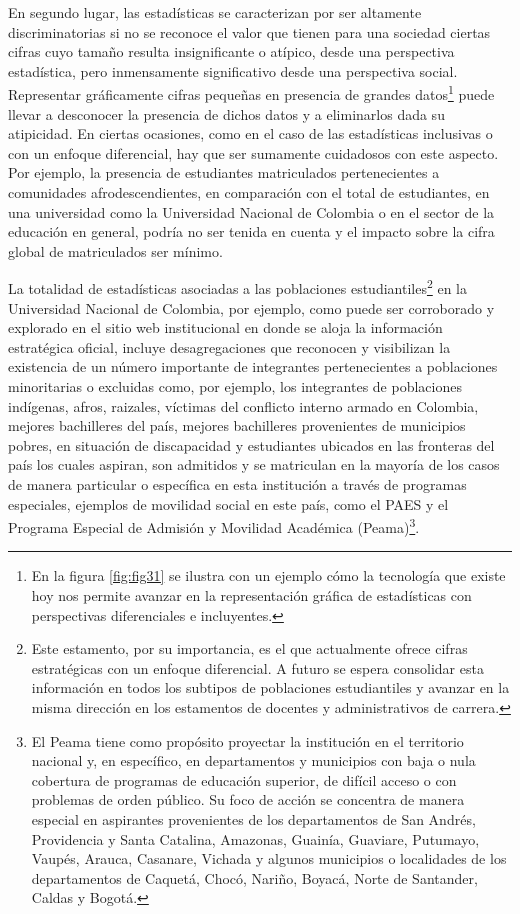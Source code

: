 \documentclass[
]{book}
\begin{document}
En segundo lugar, las estadísticas se caracterizan por ser altamente discriminatorias si no se reconoce el valor que tienen para una sociedad ciertas cifras cuyo tamaño resulta insignificante o atípico, desde una perspectiva estadística, pero inmensamente significativo desde una perspectiva social. Representar gráficamente cifras pequeñas en presencia de grandes datos\footnote{En la figura \ref{fig:fig31} se ilustra con un ejemplo cómo la tecnología que existe hoy nos permite avanzar en la representación gráfica de estadísticas con perspectivas diferenciales e incluyentes.} puede llevar a desconocer la presencia de dichos datos y a eliminarlos dada su atipicidad. En ciertas ocasiones, como en el caso de las estadísticas inclusivas o con un enfoque diferencial, hay que ser sumamente cuidadosos con este aspecto. Por ejemplo, la presencia de estudiantes matriculados pertenecientes a comunidades afrodescendientes, en comparación con el total de estudiantes, en una universidad como la Universidad Nacional de Colombia o en el sector de la educación en general, podría no ser tenida en cuenta y el impacto sobre la cifra global de matriculados ser mínimo.

La totalidad de estadísticas asociadas a las poblaciones estudiantiles\footnote{Este estamento, por su importancia, es el que actualmente ofrece cifras estratégicas con un enfoque diferencial. A futuro se espera consolidar esta información en todos los subtipos de poblaciones estudiantiles y avanzar en la misma dirección en los estamentos de docentes y administrativos de carrera.} en la Universidad Nacional de Colombia, por ejemplo, como puede ser corroborado y explorado en el sitio web institucional en donde se aloja la información estratégica oficial, incluye desagregaciones que reconocen y visibilizan la existencia de un número importante de integrantes pertenecientes a poblaciones minoritarias o excluidas como, por ejemplo, los integrantes de poblaciones indígenas, afros, raizales, víctimas del conflicto interno armado en Colombia, mejores bachilleres del país, mejores bachilleres provenientes de municipios pobres, en situación de discapacidad y estudiantes ubicados en las fronteras del país los cuales aspiran, son admitidos y se matriculan en la mayoría de los casos de manera particular o específica en esta institución a través de programas especiales, ejemplos de movilidad social en este país, como el PAES y el Programa Especial de Admisión y Movilidad Académica (Peama)\footnote{El Peama tiene como propósito proyectar la institución en el territorio nacional y, en específico, en departamentos y municipios con baja o nula cobertura de programas de educación superior, de difícil acceso o con problemas de orden público. Su foco de acción se concentra de manera especial en aspirantes provenientes de los departamentos de San Andrés, Providencia y Santa Catalina, Amazonas, Guainía, Guaviare, Putumayo, Vaupés, Arauca, Casanare, Vichada y algunos municipios o localidades de los departamentos de Caquetá, Chocó, Nariño, Boyacá, Norte de Santander, Caldas y Bogotá.}.
\end{document}
